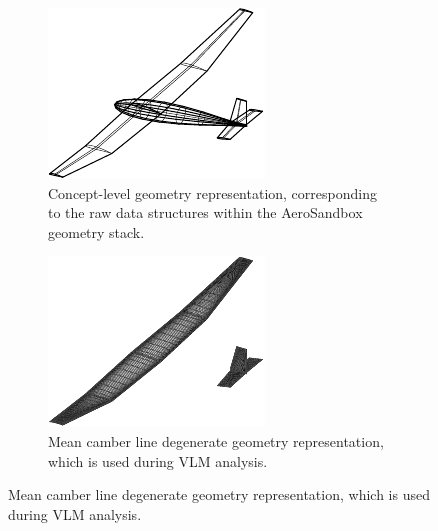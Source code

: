 \begin{figure}[H]
    \centering
    \begin{subfigure}{0.32\textwidth}
        \includegraphics[width=\textwidth]{../figures/geometry_concept-crop.pdf}
        \caption{Concept-level geometry representation, corresponding to the raw data structures within the AeroSandbox geometry stack.}
        \label{fig:geometry_concept}
    \end{subfigure}
    \begin{subfigure}{0.32\textwidth}
        \includegraphics[width=\textwidth]{../figures/geometry_mean_camber-crop.pdf}
        \caption{Mean camber line degenerate geometry representation, which is used during VLM analysis.}

\end{subfigure}
\end{figure}
